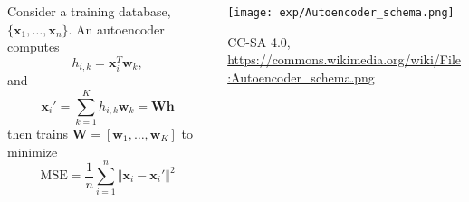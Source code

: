 \documentclass{beamer}
\begin{document}
\begin{frame}
  \begin{columns}
    \begin{column}{0.5\textwidth}
      Consider a training database, $\{\bm{x}_1,\ldots,\bm{x}_n\}$.
      An autoencoder computes
      \begin{displaymath}
        h_{i,k} = \bm{x}_i^T \bm{w}_k,
      \end{displaymath}
      and
      \begin{displaymath}
        \bm{x}_i' = \sum_{k=1}^K h_{i,k}\bm{w}_k=\bm{W}\bm{h}
      \end{displaymath}
      then trains $\bm{W}=[\bm{w}_1,\ldots,\bm{w}_K]$ to minimize
      \begin{displaymath}
        \mbox{MSE}=\frac{1}{n}\sum_{i=1}^n \Vert\bm{x}_i-\bm{x}_i'\Vert^2
      \end{displaymath}
    \end{column}
    \begin{column}{0.5\textwidth}
      \begin{center}
        \texttt{[image: exp/Autoencoder\_schema.png]}

        \begin{tiny}
          CC-SA 4.0, \url{https://commons.wikimedia.org/wiki/File:Autoencoder_schema.png}
        \end{tiny}
      \end{center}
    \end{column}
  \end{columns}
\end{frame}
\end{document}
